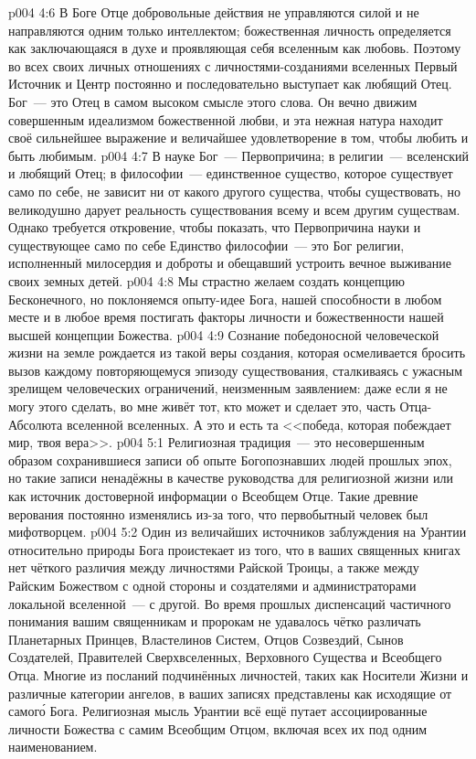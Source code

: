 \vs p004 4:6 В Боге Отце добровольные действия не управляются силой и не направляются одним только интеллектом; божественная личность определяется как заключающаяся в духе и проявляющая себя вселенным как любовь. Поэтому во всех своих личных отношениях с личностями\hyp{}созданиями вселенных Первый Источник и Центр постоянно и последовательно выступает как любящий Отец. Бог~--- это Отец в самом высоком смысле этого слова. Он вечно движим совершенным идеализмом божественной любви, и эта нежная натура находит своё сильнейшее выражение и величайшее удовлетворение в том, чтобы любить и быть любимым.
\vs p004 4:7 \pc В науке Бог~--- Первопричина; в религии~--- вселенский и любящий Отец; в философии~--- единственное существо, которое существует само по себе, не зависит ни от какого другого существа, чтобы существовать, но великодушно дарует реальность существования всему и всем другим существам. Однако требуется откровение, чтобы показать, что Первопричина науки и существующее само по себе Единство философии~--- это Бог религии, исполненный милосердия и доброты и обещавший устроить вечное выживание своих земных детей.
\vs p004 4:8 Мы страстно желаем создать концепцию Бесконечного, но поклоняемся опыту\hyp{}идее Бога, нашей способности в любом месте и в любое время постигать факторы личности и божественности нашей высшей концепции Божества.
\vs p004 4:9 Сознание победоносной человеческой жизни на земле рождается из такой веры создания, которая осмеливается бросить вызов каждому повторяющемуся эпизоду существования, сталкиваясь с ужасным зрелищем человеческих ограничений, неизменным заявлением: даже если я не могу этого сделать, во мне живёт тот, кто может и сделает это, часть Отца\hyp{}Абсолюта вселенной вселенных. А это и есть та <<победа, которая побеждает мир, твоя вера>>.
\vs p004 5:1 Религиозная традиция~--- это несовершенным образом сохранившиеся записи об опыте Богопознавших людей прошлых эпох, но такие записи ненадёжны в качестве руководства для религиозной жизни или как источник достоверной информации о Всеобщем Отце. Такие древние верования постоянно изменялись из\hyp{}за того, что первобытный человек был мифотворцем.
\vs p004 5:2 Один из величайших источников заблуждения на Урантии относительно природы Бога проистекает из того, что в ваших священных книгах нет чёткого различия между личностями Райской Троицы, а также между Райским Божеством с одной стороны и создателями и администраторами локальной вселенной~--- с другой. Во время прошлых диспенсаций частичного понимания вашим священникам и пророкам не удавалось чётко различать Планетарных Принцев, Властелинов Систем, Отцов Созвездий, Сынов Создателей, Правителей Сверхвселенных, Верховного Существа и Всеобщего Отца. Многие из посланий подчинённых личностей, таких как Носители Жизни и различные категории ангелов, в ваших записях представлены как исходящие от самог\'о Бога. Религиозная мысль Урантии всё ещё путает ассоциированные личности Божества с самим Всеобщим Отцом, включая всех их под одним наименованием.
